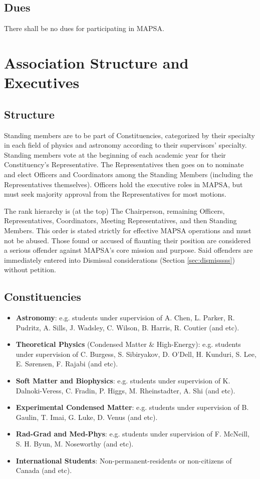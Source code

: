 \documentclass[8pt]{article}
\begin{document}
	\subsection{Dues}
	There shall be no dues for participating in MAPSA.
	
	\section{Association Structure and Executives}
	\subsection{Structure}\label{subsec:structure}
	Standing members are to be part of Constituencies, categorized by their specialty in each field of physics and astronomy according to their supervisors' specialty. Standing members vote at the beginning of each academic year for their Constituency's Representative. The Representatives then goes on to nominate and elect Officers and Coordinators among the Standing Members (including the Representatives themselves). Officers hold the executive roles in MAPSA, but must seek majority approval from the Representatives for most motions. 
	
	\noindent The rank hierarchy is (at the top) The Chairperson, remaining Officers, Representatives, Coordinators, Meeting Representatives, and then Standing Members. This order is stated strictly for effective MAPSA operations and must not be abused. Those found or accused of flaunting their position are considered a serious offender against MAPSA's core mission and purpose. Said offenders are immediately entered into Dismissal considerations (Section \ref{sec:dismisssss}) without petition.
	\subsection{Constituencies}
	\begin{itemize}
		\item \textbf{Astronomy}: e.g. students under supervision of A. Chen, L. Parker, R. Pudritz, A. Sills, J. Wadsley, C. Wilson, B. Harris, R. Coutier (and etc).
		\item \textbf{Theoretical Physics} (Condensed Matter \& High-Energy): e.g. students under supervision of C. Burgess, S. Sibiryakov, D. O'Dell, H. Kunduri, S. Lee, E. Sørensen, F. Rajabi (and etc).
		\item \textbf{Soft Matter and Biophysics}: e.g. students under supervision of K. Dalnoki-Veress, C. Fradin, P. Higgs, M. Rheinstadter, A. Shi (and etc).
		\item \textbf{Experimental Condensed Matter}: e.g. students under supervision of B. Gaulin, T. Imai, G. Luke, D. Venus (and etc).
		\item \textbf{Rad-Grad and Med-Phys}: e.g. students under supervision of F. McNeill, S. H. Byun, M. Noseworthy (and etc).
		\item \textbf{International Students}: Non-permanent-residents or non-citizens of Canada (and etc).
	\end{itemize}
	
\end{document}
